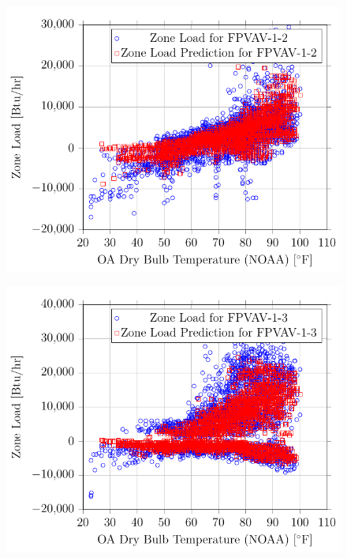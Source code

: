 \begin{figure}
\centering
\includegraphics[]{Plots/27/2017-06-27-1356-BtuhrvsOADryBulbTemperatureNOAAF.pdf}
\caption{}
\label{fig:2017-06-27-1356-BtuhrvsOADryBulbTemperatureNOAAF}
\end{figure}

\begin{figure}
\centering
\includegraphics[]{Plots/28/2017-06-27-1357-BtuhrvsOADryBulbTemperatureNOAAF.pdf}
\caption{}
\label{fig:2017-06-27-1357-BtuhrvsOADryBulbTemperatureNOAAF}
\end{figure}


